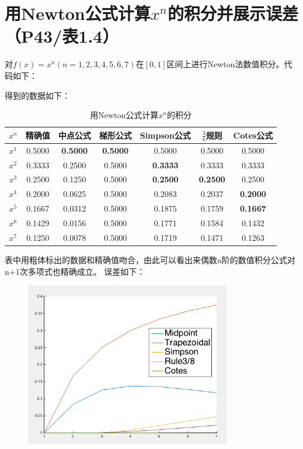 \documentclass{homework}
\begin{document}
\section{用Newton公式计算$x^n$的积分并展示误差（P43/表1.4）}
对$f(x)=x^n (n=1,2,3,4,5,6,7)$在$[0,1]$区间上进行Newton法数值积分。代码如下：

得到的数据如下：
\begin{table}[H]
\caption{用Newton公式计算$x^n$的积分}
\centering
\begin{tabular}{|c|c|c|c|c|c|c|}
\hline
$x^n$ & 精确值 & 中点公式 & 梯形公式 & Simpson公式 & $\frac{3}{8}$规则 & Cotes公式 \\\hline
$x^1$ & 0.5000 & {\bf 0.5000} & {\bf 0.5000} & 0.5000 & 0.5000 & 0.5000 \\\hline
$x^2$ & 0.3333 & 0.2500 & 0.5000 & {\bf 0.3333} & 0.3333 & 0.3333 \\\hline
$x^3$ & 0.2500 & 0.1250 & 0.5000 & {\bf 0.2500} & {\bf 0.2500} & 0.2500 \\\hline
$x^4$ & 0.2000 & 0.0625 & 0.5000 & 0.2083 & 0.2037 & {\bf 0.2000} \\\hline
$x^5$ & 0.1667 & 0.0312 & 0.5000 & 0.1875 & 0.1759 & {\bf 0.1667} \\\hline
$x^6$ & 0.1429 & 0.0156 & 0.5000 & 0.1771 & 0.1584 & 0.1432 \\\hline
$x^7$ & 0.1250 & 0.0078 & 0.5000 & 0.1719 & 0.1471 & 0.1263 \\\hline
\end{tabular}
\end{table}
表中用粗体标出的数据和精确值吻合，由此可以看出来偶数n阶的数值积分公式对n+1次多项式也精确成立。
误差如下：
\begin{figure}[H]
\includegraphics[width=9cm]{newtonerr.png}
\centering
\end{figure}
\end{document}
